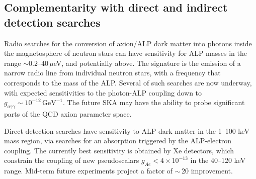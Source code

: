 \documentclass[../report.tex]{subfiles}
\begin{document}
\subsection{Complementarity with direct and indirect detection searches}
Radio searches for the conversion of axion/ALP dark matter into photons inside the magnetosphere of neutron stars can have sensitivity
for ALP masses in the range $\sim 0.2$--$40\,\mu$eV, and potentially above.  The signature is the emission of a narrow radio line from individual neutron stars, with a frequency that corresponds to the mass of the ALP.  Several of such searches are now underway, with expected sensitivities to the photon-ALP coupling down to $g_{a\gamma\gamma} \sim 10^{-12}\,\text{GeV}^{-1}$. The future SKA may have the ability to probe significant parts of the QCD axion parameter space.
 

Direct detection searches have sensitivity to ALP dark matter in the 1--100 keV mass region, via searches for an absorption triggered by the ALP-electron coupling. The currently best sensitivity is obtained by Xe detectors, which constrain the coupling of new pseudoscalars $g_{Ae} < 4 \times 10^{-13}$ in the 40--120 keV range.
Mid-term future experiments project a factor of $\sim$\,20 improvement.



\bigskip



%
\end{document}

